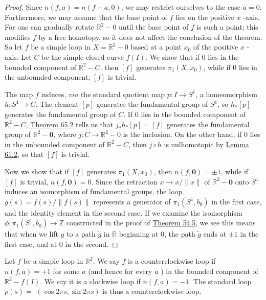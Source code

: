 \begin{proof}
Since \(n( {f,a}) = n( {f - a,0})\), we may restrict ourselves to the case \(a = 0\). Furthermore, we may assume that the base point of \(f\) lies on the positive \(x\) -axis. For one can gradually rotate \(\mathbb{R}^{2} - 0\) until the base point of \(f\) is such a point; this modifies \(f\) by a free homotopy, so it does not affect the conclusion of the theorem.
So let \(f\) be a simple loop in \(X = \mathbb{R}^{2} - 0\) based at a point \(x_{0}\) of the positive \(x\) - axis. Let \(C\) be the simple closed curve \(f( I)\). We show that if 0 lies in the bounded component of \(\mathbb{R}^{2} - C\), then \([ f]\) generates \({\pi }_{1}( {X,x_{0}})\), while if 0 lies in the unbounded component, \([ f]\) is trivial.

The map \(f\) induces, \({via}\) the standard quotient map \(p : I \rightarrow {S}^{1}\), a homeomorphism \(h : S^{1} \rightarrow C\). The element \([ p]\) generates the fundamental group of \(S^{1}\), so \(h_{ * }[ p]\) generates the fundamental group of \(C\). If 0 lies in the bounded component of \(\mathbb{R}^{2} - C\), \hyperref[thm:65.2]{Theorem 65.2} tells us that \(j_{ * }h_{ * }[ p] = [ f]\) generates the fundamental group of \(\mathbb{R}^{2} - \mathbf{0}\), where \(j : C \rightarrow {\mathbb{R}}^{2} - 0\) is the inclusion. On the other hand, if 0 lies in the unbounded component of \(\mathbb{R}^{2} - C\), then \(j \circ h\) is nulhomotopic by \hyperref[lem:61.2]{Lemma 61.2}, so that \([ f]\) is trivial.

Now we show that if \([ f]\) generates \({\pi }_{1}( {X,x_{0}})\), then \(n( {f,\mathbf{0}}) = \pm 1\), while if \([ f]\) is trivial, \(n( {f,\mathbf{0}}) = 0\). Since the retraction \(x \rightarrow x/\parallel x\parallel\) of \(\mathbb{R}^{2} - \mathbf{0}\) onto \(S^{1}\) induces an isomorphism of fundamental groups, the loop \(g( s) = f( s) /\parallel f( s) \parallel\) represents a generator of \({\pi }_{1}( {S^{1},b_{0}})\) in the first case, and the identity element in the second case. If we examine the isomorphism \(\phi : {\pi }_{1}( {S^{1},b_{0}}) \rightarrow \mathbb{Z}\) constructed in the proof of \hyperref[thm:54.5]{Theorem 54.5}, we see this means that when we lift \(g\) to a path \(\tilde{g}\) in \(\mathbb{R}\) beginning at 0, the path \(\tilde{g}\) ends at \(\pm 1\) in the first case, and at 0 in the second.
\end{proof}
\begin{definition}
Let \(f\) be a simple loop in \(\mathbb{R}^{2}\). We say \(f\) is a counterclockwise loop if \(n( {f,a}) = + 1\) for some \(a\) (and hence for every \(a\) ) in the bounded component of \(\mathbb{R}^{2} - f( I)\). We say it is a clockwise loop if \(n( {f,a}) = - 1\). The standard loop \(p( s) =\) \(( {\cos {2\pi s},\sin {2\pi s}})\) is thus a counterclockwise loop.
\end{definition}

